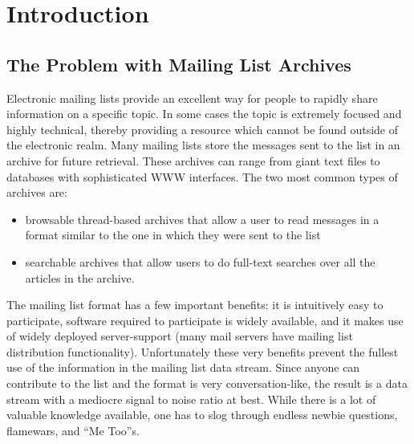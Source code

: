 
\chapter{Introduction}

\section{The Problem with Mailing List Archives}
Electronic mailing lists provide an excellent way for people to rapidly share
information on a specific topic. In some cases the topic is extremely focused
and highly technical, thereby providing a resource which cannot be found
outside of the electronic realm. Many mailing lists store the messages sent to
the list in an archive for future retrieval. These archives can range from
giant text files to databases with sophisticated WWW interfaces. The two most
common types of archives are:
\begin{itemize}
\item browsable thread-based archives that allow a user to read messages in a
  format similar to the one in which they were sent to the list
\item searchable archives that allow users to do full-text searches over all
  the articles in the archive.
\end{itemize}

The mailing list format has a few important benefits: it is intuitively easy to
participate, software required to participate is widely available, and it makes
use of widely deployed server-support (many mail servers have mailing list
distribution functionality). Unfortunately these very benefits prevent the
fullest use of the information in the mailing list data stream.  Since anyone
can contribute to the list and the format is very conversation-like, the result
is a data stream with a mediocre signal to noise ratio at best. While there is
a lot of valuable knowledge available, one has to slog through endless newbie
questions, flamewars, and ``Me Too''s.

